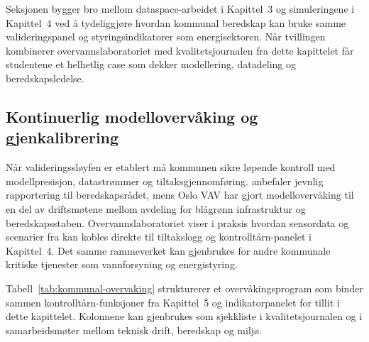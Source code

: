 Seksjonen bygger bro mellom dataspace-arbeidet i Kapittel~3 og simuleringene i Kapittel~4 ved å tydeliggjøre hvordan kommunal beredskap kan bruke samme valideringspanel og styringsindikatorer som energisektoren. Når tvillingen kombinerer overvannslaboratoriet med kvalitetsjournalen fra dette kapittelet får studentene et helhetlig case som dekker modellering, datadeling og beredskapsledelse.

\subsection{Kontinuerlig modellovervåking og gjenkalibrering}
Når valideringssløyfen er etablert må kommunen sikre løpende kontroll med modellpresisjon, datastrømmer og tiltaksgjennomføring. \citet{dsb2022beredskap} anbefaler jevnlig rapportering til beredskapsrådet, mens Oslo VAV har gjort modellovervåking til en del av driftsmøtene mellom avdeling for blågrønn infrastruktur og beredskapsstaben.\citep{oslo2023overvann} Overvannslaboratoriet viser i praksis hvordan sensordata og scenarier fra \citet{asplan2023overvannslab} kan kobles direkte til tiltakslogg og kontrolltårn-panelet i Kapittel~4. Det samme rammeverket kan gjenbrukes for andre kommunale kritiske tjenester som vannforsyning og energistyring.

Tabell~\ref{tab:kommunal-overvaking} strukturerer et overvåkingsprogram som binder sammen kontrolltårn-funksjoner fra Kapittel~5 og indikatorpanelet for tillit i dette kapittelet. Kolonnene kan gjenbrukes som sjekkliste i kvalitetsjournalen og i samarbeidsmøter mellom teknisk drift, beredskap og miljø.

